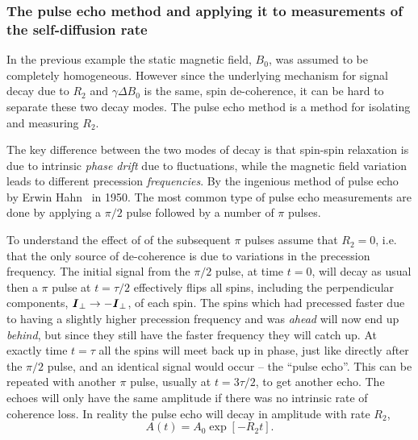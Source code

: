 \documentclass[11pt,a4paper, twocolumn,
swedish, english %
]{article}
\begin{document}
\subsubsection{The pulse echo method and applying it to
measurements of the self-diffusion rate} 

In the previous example the static magnetic field, $B_0$, was assumed
to be completely homogeneous. However since the underlying mechanism
for signal decay due to $R_2$ and $\gamma\Delta B_0$ is the same, spin
de-coherence, it can be hard to separate these two decay modes. The
pulse echo method is a method for isolating  and measuring $R_2$. 

The key difference between the two modes of decay is that spin-spin
relaxation is due to intrinsic \emph{phase drift} due to fluctuations,
while the magnetic field variation leads to different precession
\emph{frequencies}. By the ingenious method of pulse echo by Erwin
Hahn~\cite{Hahn1950} in 1950. The most common type of pulse echo
measurements are done by applying a $\pi/2$ pulse followed by a number
of $\pi$ pulses.

To understand the effect of of the subsequent $\pi$ pulses assume that
$R_2=0$, i.e. that the only source of de-coherence is due to
variations in the precession frequency. The initial signal from the
$\pi/2$ pulse, at time $t=0$, will decay as usual then a $\pi$ pulse
at $t=\tau/2$ effectively flips all spins, including the
perpendicular components, $\vb*I_\perp\to-\vb*I_\perp$, of each
spin. The spins which had precessed faster due to having a slightly
higher precession frequency and was \emph{ahead} will now end up
\emph{behind}, but since they still have the faster frequency they
will catch up. At exactly time $t=\tau$ all the spins will meet
back up in phase, just like directly after the $\pi/2$ pulse, and an
identical signal would occur -- the ``pulse echo''. This can be
repeated with another $\pi$ pulse, usually at $t=3\tau/2$, to get
another echo. The echoes will only have the same amplitude if there
was no intrinsic rate of coherence loss. In reality the pulse echo
will decay in amplitude with rate $R_2$,
\begin{equation}
A(t)=A_0\exp[-R_2t].
\end{equation}
\end{document}
